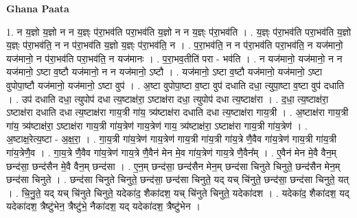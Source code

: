 \documentclass[17pt]{extarticle}
\begin{document}
\textbf{Ghana Paata } \newline

1. न य॒ज्ञो य॒ज्ञो न न य॒ज्ञ्ः प॑रा॒भव॑ति परा॒भव॑ति य॒ज्ञो न न य॒ज्ञ्ः प॑रा॒भव॑ति । . य॒ज्ञ्ः प॑रा॒भव॑ति परा॒भव॑ति य॒ज्ञो य॒ज्ञ्ः प॑रा॒भव॑ति॒ न न प॑रा॒भव॑ति य॒ज्ञो य॒ज्ञ्ः प॑रा॒भव॑ति॒ न । . प॒रा॒भव॑ति॒ न न प॑रा॒भव॑ति परा॒भव॑ति॒ न यज॑मानो॒ यज॑मानो॒ न प॑रा॒भव॑ति परा॒भव॑ति॒ न यज॑मानः । . प॒रा॒भव॒तीति॑ परा - भव॑ति । . न यज॑मानो॒ यज॑मानो॒ न न यज॑मानो॒ ऽष्टा व॒ष्टौ यज॑मानो॒ न न यज॑मानो॒ ऽष्टौ । . यज॑मानो॒ ऽष्टा व॒ष्टौ यज॑मानो॒ यज॑मानो॒ ऽष्टा वुपोपा॒ष्टौ यज॑मानो॒ यज॑मानो॒ ऽष्टा वुप॑ । . अ॒ष्टा वुपोपा॒ष्टा व॒ष्टा वुप॑ दधाति दधा॒ त्युपा॒ष्टा व॒ष्टा वुप॑ दधाति । . उप॑ दधाति दधा॒ त्युपोप॑ दधा त्य॒ष्टाक्ष॑रा॒ ऽष्टाक्ष॑रा दधा॒ त्युपोप॑ दधा त्य॒ष्टाक्ष॑रा । . द॒धा॒ त्य॒ष्टाक्ष॑रा॒ ऽष्टाक्ष॑रा दधाति दधा त्य॒ष्टाक्ष॑रा गाय॒त्री गा॑य॒ त्र्य॑ष्टाक्ष॑रा दधाति दधा त्य॒ष्टाक्ष॑रा गाय॒त्री । . अ॒ष्टाक्ष॑रा गाय॒त्री गा॑य॒ त्र्य॑ष्टाक्ष॑रा॒ ऽष्टाक्ष॑रा गाय॒त्री गा॑य॒त्रेण॑ गाय॒त्रेण॑ गाय॒
त्र्य॑ष्टाक्ष॑रा॒ ऽष्टाक्ष॑रा गाय॒त्री गा॑य॒त्रेण॑ । . अ॒ष्टाक्ष॒रेत्य॒ष्टा - अ॒क्ष॒रा॒ । . गा॒य॒त्री गा॑य॒त्रेण॑ गाय॒त्रेण॑ गाय॒त्री गा॑य॒त्री गा॑य॒त्रे णै॒वैव गा॑य॒त्रेण॑ गाय॒त्री गा॑य॒त्री गा॑य॒त्रेणै॒व । . गा॒य॒त्रे णै॒वैव गा॑य॒त्रेण॑ गाय॒त्रे णै॒वैन॑ मेन मे॒व गा॑य॒त्रेण॑ गाय॒त्रे णै॒वैन᳚म् । . ए॒वैन॑ मेन मे॒वै वैन॒म् छन्द॑सा॒ छन्द॑सैन मे॒वै वैन॒म् छन्द॑सा । . ए॒न॒म् छन्द॑सा॒ छन्द॑सैन मेन॒म् छन्द॑सा चिनुते चिनुते॒ छन्द॑सैन मेन॒म् छन्द॑सा चिनुते । . छन्द॑सा चिनुते चिनुते॒ छन्द॑सा॒ छन्द॑सा चिनुते॒ यद् यच् चि॑नुते॒ छन्द॑सा॒ छन्द॑सा चिनुते॒ यत् । . चि॒नु॒ते॒ यद् यच् चि॑नुते चिनुते॒ यदेका॑द॒ शैका॑दश॒ यच् चि॑नुते चिनुते॒ यदेका॑दश । . यदेका॑द॒ शैका॑दश॒ यद् यदेका॑दश॒ त्रैष्टु॑भेन॒ त्रैष्टु॑भे॒ नैका॑दश॒ यद् यदेका॑दश॒ त्रैष्टु॑भेन । \newline
\end{document}
